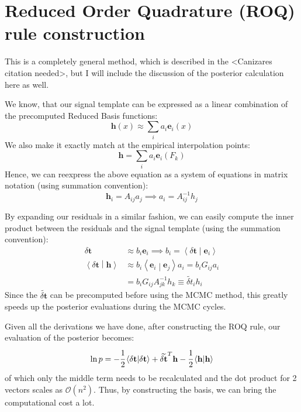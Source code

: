 \documentclass{scrreprt}
\newcommand{\bigo}[1]{\ensuremath{\mathcal{O}\left( #1 \right)}}
\renewcommand{\vec}[1]{\ensuremath{\mathbf{#1}}}
\newcommand{\braket}[2]{\ensuremath{\left\langle #1 \middle| #2 \right\rangle}}
\begin{document}
    \chapter{Reduced Order Quadrature (ROQ) rule construction}

    This is a completely general method, which is described in the <Canizares
    citation needed>, but I will include the discussion of the posterior
    calculation here as well.

    We know, that our signal template can be expressed as a linear combination of
    the precomputed Reduced Basis functions:
    \begin{equation}
        \vec{h} \left( x \right) \approx \sum_{i} a_{i}\vec{e}_{i} \left( x \right)
    \end{equation}
    We also make it exactly match at the empirical interpolation points:
    \begin{equation}
        \vec{h} = \sum_{i} a_{i} \vec{e}_{i} \left( F_{k} \right)
    \end{equation}
    Hence, we can reexpress the above equation as a system of equations in
    matrix notation (using summation convention):
    \begin{equation}
        \vec{h}_{i} = A_{ij} a_{j} \implies a_{i} = A^{-1}_{ij} h_{j} 
    \end{equation} 

    By expanding our residuals in a similar fashion, we can easily compute the
    inner product between the residuals and the signal template (using the
    summation convention):
    \begin{align}
        \delta\vec{t} &\approx b_{i} \vec{e}_{i} 
        \implies
        b_{i} = \braket{\delta \vec{t}}{\vec{e}_{i}} 
        \\
        \braket{\delta\vec{t}}{\vec{h}} &\approx b_{i}
        \braket{\vec{e}_{i}}{\vec{e}_{j}} a_i
        = b_{i} G_{ij} a_{i}
        \\
        &= b_{i} G_{ij} A^{-1}_{jk} h_{k} \equiv \widetilde{\delta t}_i h_{i}
    \end{align}
    Since the $\widetilde{\delta \vec{t}}$ can be precomputed before using the
    MCMC method, this greatly speeds up the posterior evaluations during the MCMC
    cycles.

    Given all the derivations we have done, after constructing the ROQ rule, our
    evaluation of the posterior becomes:
    \begin{equation}
        \ln p = -\cfrac{1}{2} \braket{\delta\vec{t}}{\delta\vec{t}} 
        + \widetilde{\delta\vec{t}}^{T}\vec{h} 
        -\cfrac{1}{2} \braket{\vec{h}}{\vec{h}}
    \end{equation}
    of which only the middle term needs to be recalculated and the dot product for
    2 vectors scales as $\bigo{n^{2}}$.
    Thus, by constructing the basis, we can bring the computational cost a lot.
\end{document}
